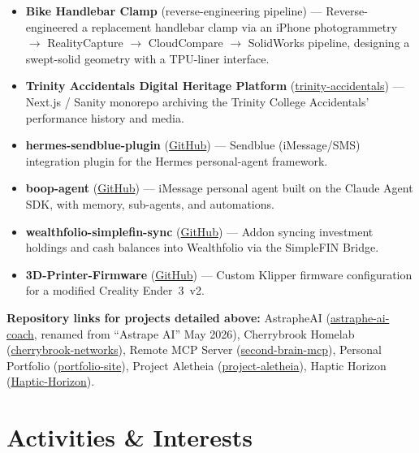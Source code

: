 \documentclass[10pt, letterpaper]{article}
\begin{document}
\vspace{2pt}
\begin{itemize}
  \item \textbf{Bike Handlebar Clamp} (reverse-engineering pipeline) --- Reverse-engineered a
        replacement handlebar clamp via an iPhone photogrammetry $\to$ RealityCapture $\to$
        CloudCompare $\to$ SolidWorks pipeline, designing a swept-solid geometry with a TPU-liner
        interface.
  \item \textbf{Trinity Accidentals Digital Heritage Platform}
        (\href{https://github.com/sbalbale/trinity-accidentals}{trinity-accidentals}) --- Next.js /
        Sanity monorepo archiving the Trinity College Accidentals' performance history and media.
  \item \textbf{hermes-sendblue-plugin}
        (\href{https://github.com/sbalbale/hermes-sendblue-plugin}{GitHub}) --- Sendblue
        (iMessage/SMS) integration plugin for the Hermes personal-agent framework.
  \item \textbf{boop-agent} (\href{https://github.com/sbalbale/boop-agent}{GitHub}) --- iMessage
        personal agent built on the Claude Agent SDK, with memory, sub-agents, and automations.
  \item \textbf{wealthfolio-simplefin-sync}
        (\href{https://github.com/sbalbale/wealthfolio-simplefin-sync}{GitHub}) --- Addon syncing
        investment holdings and cash balances into Wealthfolio via the SimpleFIN Bridge.
  \item \textbf{3D-Printer-Firmware}
        (\href{https://github.com/sbalbale/3D-Printer-Firmware}{GitHub}) --- Custom Klipper
        firmware configuration for a modified Creality Ender~3~v2.
\end{itemize}

\vspace{2pt}
\textbf{Repository links for projects detailed above:} AstrapheAI
(\href{https://github.com/sbalbale/astraphe-ai-coach}{astraphe-ai-coach}, renamed from
``Astrape AI'' May 2026), Cherrybrook Homelab
(\href{https://github.com/sbalbale/cherrybrook-networks}{cherrybrook-networks}), Remote MCP Server
(\href{https://github.com/sbalbale/second-brain-mcp}{second-brain-mcp}), Personal Portfolio
(\href{https://github.com/sbalbale/portfolio-site}{portfolio-site}), Project Aletheia
(\href{https://github.com/sbalbale/project-aletheia}{project-aletheia}), Haptic Horizon
(\href{https://github.com/sbalbale/Haptic-Horizon}{Haptic-Horizon}).

\section{Activities \& Interests}
\end{document}
